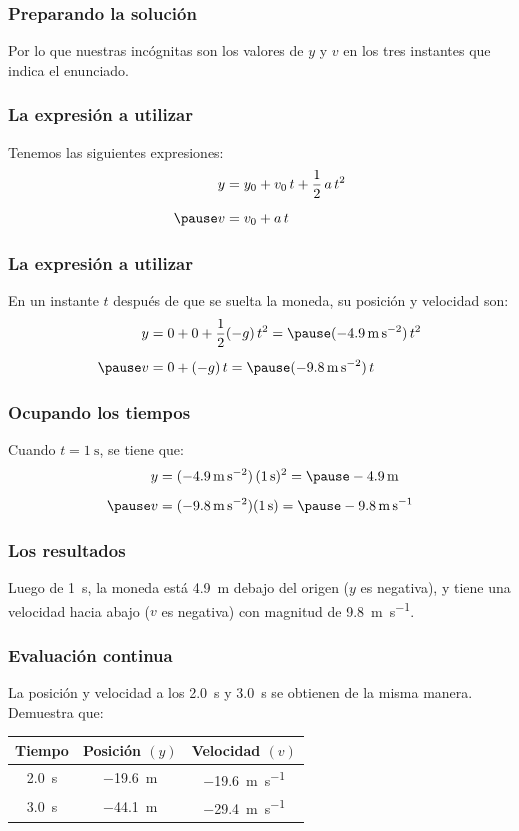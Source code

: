 \documentclass[14pt]{beamer}
\begin{document}
\begin{frame}
\frametitle{Preparando la solución}
Por lo que nuestras incógnitas son los valores de $y$ y $v$ en los tres instantes que indica el enunciado.
\end{frame}
\begin{frame}
\frametitle{La expresión a utilizar}
Tenemos las siguientes expresiones:
\pause
\begin{eqnarray*}
\begin{aligned}
y &= y_{0} + v_{0} \, t + \dfrac{1}{2} \, a \, t^{2} \\[0.5em] \pause
v &= v_{0} + a \, t 
\end{aligned}
\end{eqnarray*}
\end{frame}
\begin{frame}
\frametitle{La expresión a utilizar}
En un instante $t$ después de que se suelta la moneda, su posición y velocidad son:
\pause
\begin{eqnarray*}
\begin{aligned}
y &= 0 + 0 + \dfrac{1}{2} (-g) \, t^{2} = \pause (\SI{-4.9}{\meter\per\square\second}) \, t^{2} \\[0.5em] \pause
v &= 0 + (-g) \, t = \pause (\SI{-9.8}{\meter\per\square\second}) \, t
\end{aligned}
\end{eqnarray*}
\end{frame}
\begin{frame}
\frametitle{Ocupando los tiempos}
Cuando $t = \SI{1}{\second}$, se tiene que:
\pause
\begin{eqnarray*}
\begin{aligned}
y &= (\SI{-4.9}{\meter\per\square\second}) \, (\SI{1}{\second})^{2} = \pause \SI{-4.9}{\meter} \\[0.5em] \pause
v &= (\SI{-9.8}{\meter\per\square\second}) (\SI{1}{\second}) = \pause \SI{-9.8}{\meter\per\second}
\end{aligned}
\end{eqnarray*}
\end{frame}
\begin{frame}
\frametitle{Los resultados}
Luego de \SI{1}{\second}, la moneda está \SI{4.9}{\meter} debajo del origen ($y$ es negativa), \pause y tiene una velocidad hacia abajo ($v$ es negativa) con magnitud de \SI{9.8}{\meter\per\second}.
\end{frame}
\begin{frame}
\frametitle{Evaluación continua}
La posición y velocidad a los \SI{2.0}{\second} y \SI{3.0}{\second} se obtienen de la misma manera.
\pause
Demuestra que:
\begin{table}
\centering
\begin{tabular}{c | c | c}
Tiempo & Posición $(y)$& Velocidad $(v)$ \\ \hline
\SI{2.0}{\second} & \SI{-19.6}{\meter} & \SI{-19.6}{\meter\per\second} \\ \hline
\SI{3.0}{\second} & \SI{-44.1}{\meter} & \SI{-29.4}{\meter\per\second} \\ \hline
\end{tabular}
\end{table}
\end{frame}
\end{document}
